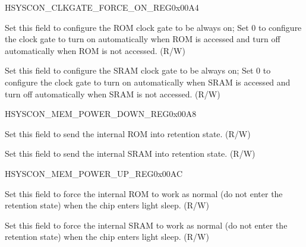 \begin{register}{H}{SYSCON\_CLKGATE\_FORCE\_ON\_REG}{0x00A4}\label{regdesc:SYSCONCLKGATEFORCEONREG}
%
%
%
\regnewline%
\begin{regdesc}\begin{reglist}
\label{fielddesc:SYSCONROMCLKGATEFORCEON}\item [SYSCON\_ROM\_CLKGATE\_FORCE\_ON] Set this field to configure the ROM clock gate to be always on; Set 0 to configure the clock gate to turn on automatically when ROM is accessed and turn off automatically when ROM is not accessed. (R/W)
\label{fielddesc:SYSCONSRAMCLKGATEFORCEON}\item [SYSCON\_SRAM\_CLKGATE\_FORCE\_ON] Set this field to configure the SRAM clock gate to be always on; Set 0 to configure the clock gate to turn on automatically when SRAM is accessed and turn off automatically when SRAM is not accessed. (R/W)
\end{reglist}\end{regdesc}
\end{register}


\begin{register}{H}{SYSCON\_MEM\_POWER\_DOWN\_REG}{0x00A8}\label{regdesc:SYSCONMEMPOWERDOWNREG}
%
%
%
\regnewline%
\begin{regdesc}\begin{reglist}
\label{fielddesc:SYSCONROMPOWERDOWN}\item [SYSCON\_ROM\_POWER\_DOWN] Set this field to send the internal ROM into retention state. (R/W)
\label{fielddesc:SYSCONSRAMPOWERDOWN}\item [SYSCON\_SRAM\_POWER\_DOWN] Set this field to send the internal SRAM into retention state. (R/W)
\end{reglist}\end{regdesc}
\end{register}

\begin{register}{H}{SYSCON\_MEM\_POWER\_UP\_REG}{0x00AC}\label{regdesc:SYSCONMEMPOWERUPREG}
%
%
%
\regnewline%
\begin{regdesc}\begin{reglist}
\label{fielddesc:SYSCONROMPOWERUP}\item [SYSCON\_ROM\_POWER\_UP] Set this field to force the internal ROM to work as normal (do not enter the retention state) when the chip enters light sleep. (R/W)
\label{fielddesc:SYSCONSRAMPOWERUP}\item [SYSCON\_SRAM\_POWER\_UP] Set this field to force the internal SRAM to work as normal (do not enter the retention state) when the chip enters light sleep. (R/W)
\end{reglist}\end{regdesc}
\end{register}

